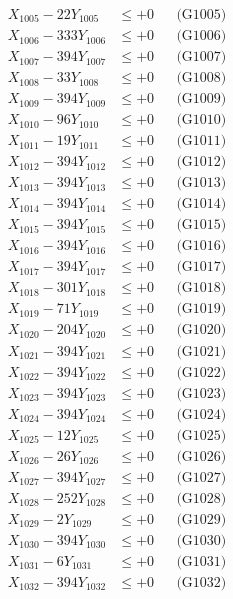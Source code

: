 \documentclass[a4paper,10pt]{article}
\begin{document}
{\begin{align}
X_{1005} - 22Y_{1005} &\leq +0 && \text{(G1005)} \\
X_{1006} - 333Y_{1006} &\leq +0 && \text{(G1006)} \\
X_{1007} - 394Y_{1007} &\leq +0 && \text{(G1007)} \\
X_{1008} - 33Y_{1008} &\leq +0 && \text{(G1008)} \\
X_{1009} - 394Y_{1009} &\leq +0 && \text{(G1009)} \\
X_{1010} - 96Y_{1010} &\leq +0 && \text{(G1010)} \\
\allowbreak
X_{1011} - 19Y_{1011} &\leq +0 && \text{(G1011)} \\
X_{1012} - 394Y_{1012} &\leq +0 && \text{(G1012)} \\
X_{1013} - 394Y_{1013} &\leq +0 && \text{(G1013)} \\
X_{1014} - 394Y_{1014} &\leq +0 && \text{(G1014)} \\
X_{1015} - 394Y_{1015} &\leq +0 && \text{(G1015)} \\
X_{1016} - 394Y_{1016} &\leq +0 && \text{(G1016)} \\
X_{1017} - 394Y_{1017} &\leq +0 && \text{(G1017)} \\
X_{1018} - 301Y_{1018} &\leq +0 && \text{(G1018)} \\
X_{1019} - 71Y_{1019} &\leq +0 && \text{(G1019)} \\
X_{1020} - 204Y_{1020} &\leq +0 && \text{(G1020)} \\
\allowbreak
X_{1021} - 394Y_{1021} &\leq +0 && \text{(G1021)} \\
X_{1022} - 394Y_{1022} &\leq +0 && \text{(G1022)} \\
X_{1023} - 394Y_{1023} &\leq +0 && \text{(G1023)} \\
X_{1024} - 394Y_{1024} &\leq +0 && \text{(G1024)} \\
X_{1025} - 12Y_{1025} &\leq +0 && \text{(G1025)} \\
X_{1026} - 26Y_{1026} &\leq +0 && \text{(G1026)} \\
X_{1027} - 394Y_{1027} &\leq +0 && \text{(G1027)} \\
X_{1028} - 252Y_{1028} &\leq +0 && \text{(G1028)} \\
X_{1029} - 2Y_{1029} &\leq +0 && \text{(G1029)} \\
X_{1030} - 394Y_{1030} &\leq +0 && \text{(G1030)} \\
\allowbreak
X_{1031} - 6Y_{1031} &\leq +0 && \text{(G1031)} \\
X_{1032} - 394Y_{1032} &\leq +0 && \text{(G1032)} \\

\end{align}}
\end{document}
